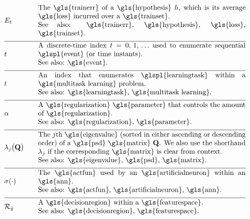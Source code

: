 \begin{align}                          
	&\trainerror &\quad &\parbox{.85\textwidth}{The \gls{trainerr} of a \gls{hypothesis} $\hypothesis$, which is its 
		average \gls{loss} incurred over a \gls{trainset}.
		\\ See also: \gls{trainerr}, \gls{hypothesis}, \gls{loss}, \gls{trainset}. }\nonumber \\[2mm] \hline \nonumber\\[-5mm]
	&\timeidx &\quad &\parbox{.85\textwidth}{A discrete-time index $\timeidx=0, \,1, \,\ldots$ used to 
		enumerate sequential \glspl{event} (or time instants). 
		\\ See also: \gls{event}. }\nonumber \\[2mm] \hline \nonumber\\[-5mm]
	&\taskidx &\quad &\parbox{.85\textwidth}{An index that enumerates
		\glspl{learningtask} within a \gls{multitask learning} problem.
		\\ See also: \gls{learningtask}, \gls{multitask learning}. }\nonumber \\[2mm] \hline \nonumber\\[-5mm]
	&\regparam &\quad &\parbox{.85\textwidth}{A \gls{regularization} \gls{parameter} that controls 
		the amount of \gls{regularization}.
		\\ See also: \gls{regularization}, \gls{parameter}. } \nonumber \\[2mm] \hline \nonumber\\[-5mm]
	&\eigval{\featureidx}\big( \mathbf{Q} \big) &\quad &\parbox{.85\textwidth}{The $\featureidx$th 
		\gls{eigenvalue} (sorted in either ascending or descending order) of a \gls{psd} \gls{matrix} $\mathbf{Q}$. We also 
		use the shorthand $\eigval{\featureidx}$ if the corresponding \gls{matrix} is clear from context.
		\\ See also: \gls{eigenvalue}, \gls{psd}, \gls{matrix}. }\nonumber \\[2mm] \hline \nonumber\\[-5mm]
	&\actfun(\cdot) &\quad &\parbox{.85\textwidth}{The \gls{actfun} used by an \gls{artificialneuron} within an \gls{ann}.
		\\ See also: \gls{actfun}, \gls{artificialneuron}, \gls{ann}. }\nonumber \\[2mm] \hline \nonumber\\[-5mm]
	&\decreg{\hat{\truelabel}} &\quad &\parbox{.85\textwidth}{A \gls{decisionregion} within a \gls{featurespace}.
		\\ See also: \gls{decisionregion}, \gls{featurespace}. }\nonumber
\end{align}     

